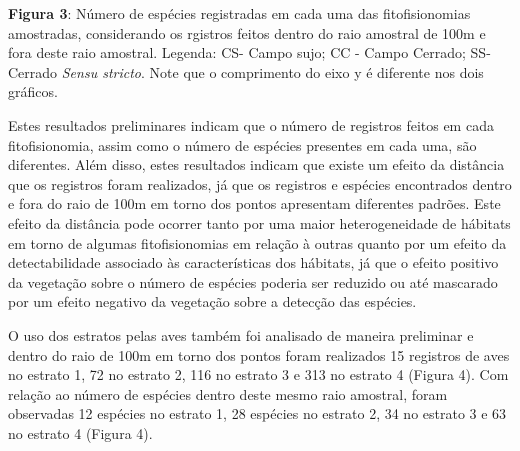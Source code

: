 \textbf{Figura 3}: Número de espécies registradas em cada uma das fitofisionomias amostradas, considerando os rgistros feitos dentro do raio amostral de 100m e fora deste raio amostral. Legenda: CS- Campo sujo; CC -  Campo Cerrado; SS- Cerrado \textit{Sensu stricto}. Note que o comprimento do eixo y é diferente nos dois gráficos.

Estes resultados preliminares indicam que o número de registros feitos em cada fitofisionomia, assim como o número de espécies presentes em cada uma, são diferentes. Além disso, estes resultados indicam que existe um efeito da distância que os registros foram realizados, já que os registros e espécies encontrados dentro e fora do raio de 100m em torno dos pontos apresentam diferentes padrões. Este efeito da distância pode ocorrer tanto por uma maior heterogeneidade de hábitats em torno de algumas fitofisionomias em relação à outras quanto por um efeito da detectabilidade associado às características dos hábitats, já que o efeito positivo da vegetação sobre o número de espécies poderia ser reduzido ou até mascarado por um efeito negativo da vegetação sobre a detecção das espécies.

O uso dos estratos pelas aves também foi analisado de maneira preliminar e dentro do raio de 100m em torno dos pontos foram realizados 15 registros de aves no estrato 1, 72 no estrato 2, 116 no estrato 3 e 313 no estrato 4 (Figura 4). Com relação ao número de espécies dentro deste mesmo raio amostral, foram observadas 12 espécies no estrato 1, 28 espécies no estrato 2, 34 no estrato 3 e 63 no estrato 4 (Figura 4).